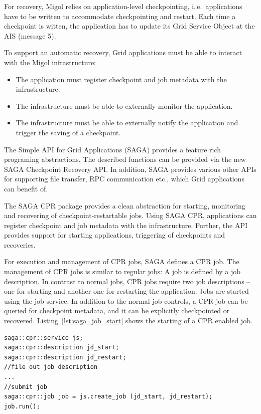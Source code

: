\documentclass[times, 10pt,twocolumn]{article}
\begin{document}
For recovery, Migol relies on 
application-level checkpointing, i.\,e.\ applications have to be
written to accommodate checkpointing and restart. 
Each time a checkpoint is witten, the application has to update
its Grid Service Object at the AIS (message 5). 

To support an automatic recovery, Grid applications must be able to interact with the Migol infrastructure:
\begin{itemize}
    \item The application must register checkpoint and job metadata with the infrastructure.
    \item The infrastructure must be able to externally monitor the application.
    \item The infrastructure must be able to externally notify the application and trigger the saving of a checkpoint.
\end{itemize}  
The Simple API for Grid Applications (SAGA) provides a feature rich programing abstractions. The described functions 
can be  provided via the new SAGA Checkpoint Recovery API. In addition, SAGA provides  
various other APIs for supporting file transfer, RPC communication etc., which Grid applications can benefit of.                           


                                                                                                         
The SAGA CPR package provides a clean abstraction for starting,
monitoring and recovering of checkpoint-restartable jobs.
Using SAGA CPR, applications can register checkpoint and job metadata with the infrastructure. 
Further, the API provides support for starting applications, triggering of checkpoints and recoveries.  

For execution and management of CPR jobs, SAGA defines a CPR job. The management of 
CPR jobs is similar to regular jobs: A job is defined by a job description. In contrast to normal jobs, 
CPR jobs require  two job descriptions -- one for starting and another one for restarting the application.
Jobs are started using the job service. In addition to the normal job controls, a CPR job can be queried for checkpoint metadata, and 
it can be explicitly checkpointed or recovered. Listing~\ref{lst:saga_job_start} shows the starting of a CPR enabled job.

\begin{lstlisting}[style=myListing, caption={SAGA CPR: Starting a Job with CPR Support},  label={lst:saga_job_start}]
saga::cpr::service js; 
saga::cpr::description jd_start;
saga::cpr::description jd_restart;
//file out job description
...
//submit job  
saga::cpr::job job = js.create_job (jd_start, jd_restart);
job.run();
\end{lstlisting}
    
\end{document}
